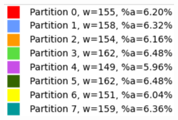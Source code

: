 \begin{figure}[h]
\centering
\begin{subfigure}{.33\textwidth}
    \centering
    \caption[short]{}
\end{subfigure}%
\begin{subfigure}{.33\textwidth}
    \centering
    \caption[short]{}
\end{subfigure}%
\begin{subfigure}{.33\textwidth}
    \centering
    \includegraphics[width=0.9\linewidth]{images/results/m_k/with/1/results}

\end{subfigure}
\end{figure}
